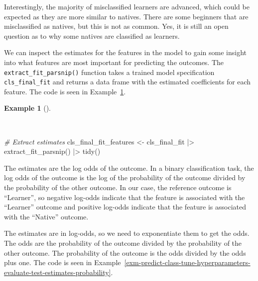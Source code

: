 \documentclass[
  letterpaper,
  krantz1]{latex/krantz-mod}
\newenvironment{Shaded}{\begin{snugshade}}{\end{snugshade}}
\newcommand{\CommentTok}[1]{\textcolor[rgb]{0.00,0.00,0.00}{\textit{#1}}}
\newcommand{\FunctionTok}[1]{\textcolor[rgb]{0.00,0.00,0.00}{#1}}
\newcommand{\NormalTok}[1]{\textcolor[rgb]{0.00,0.00,0.00}{#1}}
\newcommand{\OtherTok}[1]{\textcolor[rgb]{0.00,0.00,0.00}{#1}}
\newcommand{\SpecialCharTok}[1]{\textcolor[rgb]{0.00,0.00,0.00}{#1}}
\theoremstyle{definition}
\newtheorem{example}{Example}[chapter]
\theoremstyle{definition}
\theoremstyle{remark}
\begin{document}
Interestingly, the majority of misclassified learners are advanced,
which could be expected as they are more similar to natives. There are
some beginners that are misclassified as natives, but this is not as
common. Yes, it is still an open question as to why some natives are
classified as learners.

We can inspect the estimates for the features in the model to gain some
insight into what features are most important for predicting the
outcomes. The \texttt{extract\_fit\_parsnip()} function takes a trained
model specification \texttt{cls\_final\_fit} and returns a data frame
with the estimated coefficients for each feature. The code is seen in
Example~\ref{exm-predict-class-tune-hyperparameters-evaluate-test-estimates}.

\begin{example}[]\protect\hypertarget{exm-predict-class-tune-hyperparameters-evaluate-test-estimates}{}\label{exm-predict-class-tune-hyperparameters-evaluate-test-estimates}

~

\begin{Shaded}
\begin{Highlighting}[numbers=left,,]
\CommentTok{\# Extract estimates}
\NormalTok{cls\_final\_fit\_features }\OtherTok{\textless{}{-}}
\NormalTok{  cls\_final\_fit }\SpecialCharTok{|\textgreater{}}
  \FunctionTok{extract\_fit\_parsnip}\NormalTok{() }\SpecialCharTok{|\textgreater{}}
  \FunctionTok{tidy}\NormalTok{()}
\end{Highlighting}
\end{Shaded}

\end{example}

The estimates are the log odds of the outcome. In a binary
classification task, the log odds of the outcome is the log of the
probability of the outcome divided by the probability of the other
outcome. In our case, the reference outcome is ``Learner'', so negative
log-odds indicate that the feature is associated with the ``Learner''
outcome and positive log-odds indicate that the feature is associated
with the ``Native'' outcome.

The estimates are in log-odds, so we need to exponentiate them to get
the odds. The odds are the probability of the outcome divided by the
probability of the other outcome. The probability of the outcome is the
odds divided by the odds plus one. The code is seen in
Example~\ref{exm-predict-class-tune-hyperparameters-evaluate-test-estimates-probability}.
\end{document}
